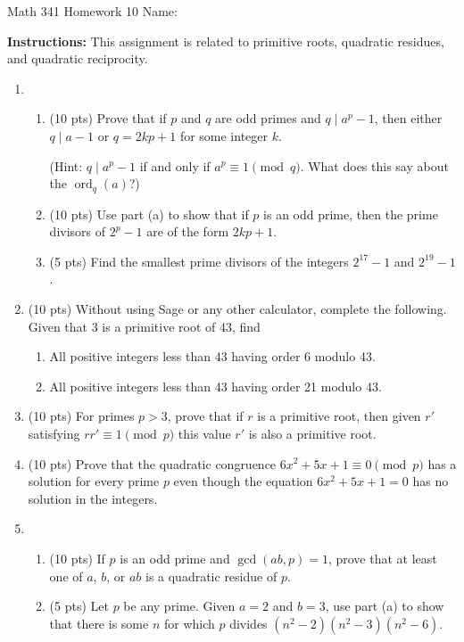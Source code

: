 \documentclass[12pt]{article}
\DeclareMathOperator{\ord}{ord}
\begin{document}
	Math 341 Homework 10
	\hfill
	Name: \underline{\hspace*{2in}}
	
	\textbf{Instructions:} This assignment is related to primitive roots, quadratic residues, and quadratic reciprocity.
\begin{enumerate}
	\item \begin{enumerate}
		\item (10 pts) Prove that if $p$ and $q$ are odd primes and $q\mid a^p-1$, then either $q\mid a-1$ or $q=2kp+1$ for some integer $k$.
		
			(Hint: $q\mid a^p-1$ if and only if $a^p\equiv 1\pmod q$. What does this say about the $\ord_q(a)$?)
			\vfill
		\item (10 pts) Use part (a) to show that if $p$ is an odd prime, then the prime divisors of $2^p-1$ are of the form $2kp+1$.
			\vfill
		\item (5 pts) Find the smallest prime divisors of the integers $2^{17}-1$ and $2^{19}-1$.
			\vskip 1in
	\end{enumerate}
	\newpage
	\item (10 pts) Without using Sage or any other calculator, complete the following. Given that 3 is a primitive root of 43, find
		\begin{enumerate}
			\item All positive integers less than 43 having order 6 modulo 43.\vskip 1in
			\item All positive integers less than 43 having order 21 modulo 43.\vskip 1in
		\end{enumerate}
	\item (10 pts) For primes $p>3$, prove that if $r$ is a primitive root, then given $r'$ satisfying $rr'\equiv 1\pmod p$ this value $r'$ is also a primitive root.
		\vfill 
	\newpage
	\item (10 pts) Prove that the quadratic congruence $6x^2+5x+1\equiv 0\pmod p$ has a solution for every prime $p$ even though the equation $6x^2+5x+1=0$ has no solution in the integers.
	\vfill
	\item\begin{enumerate}
		\item  (10 pts) If $p$ is an odd prime and $\gcd(ab,p)=1$, prove that at least one of $a$, $b$, or $ab$ is a quadratic residue of $p$.
		\vfill
		\item (5 pts) Let $p$ be any prime. Given $a=2$ and $b=3$, use part (a) to show that there is some $n$ for which $p$ divides $(n^2-2)(n^2-3)(n^2-6)$.\vskip 1in
	\end{enumerate}
\end{enumerate}
		
\end{document}
